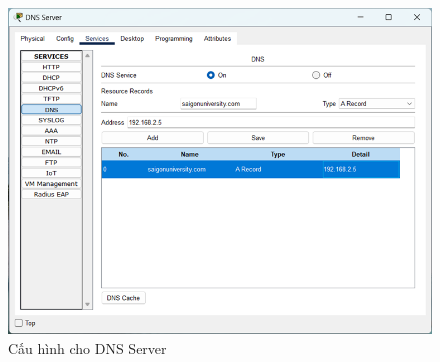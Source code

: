 \documentclass[12pt, a4paper]{article}
\begin{document}
\begin{flushleft}
\begin{itemize}[leftmargin=0.75cm]
\begin{figure}[H]
				\includegraphics[width=1\textwidth]{dns_config.png}
				\caption{Cấu hình cho DNS Server}
			\end{figure}
		\end{itemize}
	\end{flushleft}

	\newpage
\end{document}
